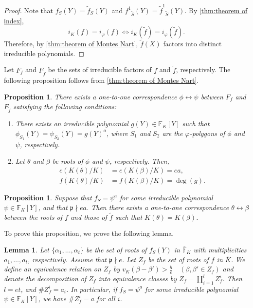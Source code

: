 \documentclass[10pt,a4paper]{amsart}
\newcommand{\field}[1]{\mathbb{#1}}
\newtheorem{lemma}[theorem]{Lemma}
\newtheorem{proposition}[theorem]{Proposition}
\numberwithin{equation}{section}
\begin{document}
  \begin{proof}
    Note that $f_S(Y) = \tilde{f}_S(Y)$ and ${f^1}_{\tilde{S}}(Y) = {\tilde{f}^1}_{\tilde{S}}(Y)$. 
    By \cref{thm:theorem of index}, 
    \[
      i_K(f) = i_{\varphi}(f) \Leftrightarrow i_K(\tilde{f}) = i_{\varphi}(\tilde{f}). 
    \]
    Therefore, by \cref{thm:theorem of Montes Nart}, $\tilde{f}(X)$ factors into distinct irreducible polynomials. 
  \end{proof}

  Let $F_f$ and $F_{\tilde{f}}$ be the sets of irreducible factors of $f$ and $\tilde{f}$, respectively. 
  The following proposition follows from \cref{thm:theorem of Montes Nart}. 

  \begin{proposition}\label{prop:claim 3}
    There exists a one-to-one correspondence $\phi \leftrightarrow \psi$ between $F_f$ and $F_{\tilde{f}}$ satisfying the following conditions: 
    \begin{enumerate}
      \item There exists an irreducible polynomial $g(Y) \in \field{F}_K[Y]$ such that $\phi_{S_1}(Y) = \psi_{S_2}(Y) = g(Y)^a$, where $S_1$ and $S_2$ are the $\varphi$-polygons of $\phi$ and $\psi$, respectively. 
      \item Let $\theta$ and $\beta$ be roots of $\phi$ and $\psi$, respectively. Then, 
      \begin{align}
        e(K(\theta)/K) &= e(K(\beta)/K) = ea, \\
        f(K(\theta)/K) &= f(K(\beta)/K) = \deg(g). 
      \end{align}
    \end{enumerate}
  \end{proposition}

  \begin{proposition}\label{prop:claim 4}
    Suppose that $f_S = \psi^a$ for some irreducible polynomial $\psi \in \field{F}_K[Y]$, and 
    that $\mathfrak{p} \nmid ea$. 
    Then there exists a one-to-one correspondence $\theta \leftrightarrow \beta$ between the roots of $f$ and those of $\tilde{f}$ such that $K(\theta) = K(\beta)$. 
  \end{proposition}

  To prove this proposition, we prove the following lemma. 

  \begin{lemma}\label{lem:classification of roots}
    Let $\{\alpha_1, \dots ,\alpha_t\}$ be the set of roots of $f_S(Y)$ in $\overline{\field{F}}_K$ 
    with multiplicities $a_1, \dots ,a_t$, respectively. Assume that $\mathfrak{p} \nmid e$. 
    Let $Z_f$ be the set of roots of $f$ in $\overline{K}$. 
    We define an equivalence relation on $Z_f$ by $v_K(\beta - \beta') > \frac{h}{e} \quad (\beta, \beta' \in Z_f)$ and 
    denote the decomposition of $Z_f$ into equivalence classes by $Z_f = \coprod_{i = 1}^l Z_f^i$. 
    Then $l = et$, and $\#Z_f^i = a_i$. 
    In particular, if $f_S = \psi^a$ for some irreducible polynomial $\psi \in \field{F}_K[Y]$, 
    we have $\#Z_f^i = a$ for all $i$. 
  \end{lemma}
\end{document}

